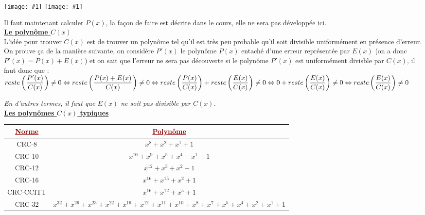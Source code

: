 \documentclass{article}
\newcommand{\dred}[1]{\textcolor{darkred}{\textbf{#1}}}
\newcommand{\imageR}[2]{\texttt{[image: \#1]}}
\newcommand{\imageRT}[2]{\texttt{[image: \#1]}}
\newcommand{\stitre}[1]{\noindent\textbf{\underline{#1}} \\}
\begin{document}
\begin{center}\imageRT{CN_107.png}{100} \imageR{CN_108.png}{200}\end{center}

\noindent Il faut maintenant calculer $P(x)$, la façon de faire est décrite dans le cours, elle ne sera pas 
développée ici. \\

\stitre{Le polynôme $C(x)$}

\noindent L'idée pour trouver $C(x)$ est de trouver un polynôme tel qu'il est très peu probable qu'il soit 
divisible uniformément en présence d'erreur. On prouve ça de la manière suivante, on considère $P'(x)$ le 
polynôme $P(x)$ entaché d'une erreur représentée par $E(x)$ (on a donc $P'(x)=P(x)+E(x)$) et on sait que l'erreur
ne sera pas découverte si le polynôme $P'(x)$ est uniformément divisble par $C(x)$, il faut donc que : \\
$reste\left(\dfrac{P'(x)}{C(x)}\right) \neq 0 \\
\Leftrightarrow reste\left(\dfrac{P(x)+E(x)}{C(x)}\right) \neq 0 \\
\Leftrightarrow reste\left(\dfrac{P(x)}{C(x)}\right) + reste\left(\dfrac{E(x)}{C(x)}\right) \neq 0 \\
\Leftrightarrow 0 + reste\left(\dfrac{E(x)}{C(x)}\right) \neq 0 \\
\Leftrightarrow reste\left(\dfrac{E(x)}{C(x)}\right) \neq 0 \\$

\noindent\textit{En d'autres termes, il faut que $E(x)$ ne soit pas divisible par $C(x)$.} \\

\stitre{Les polynômes $C(x)$ typiques}

\begin{center}
	\begin{tabular}{|*{2}{c|}}
	\hline
	\dred{\underline{Norme}} & \dred{\underline{Polynôme}} \\
	\hline
	CRC-8 & $x^8+x^2+x^1+1$ \\
	\hline
	CRC-10 & $x^{10}+x^9+x^5+x^4+x^1+1$ \\
	\hline
	CRC-12 & $x^{12}+x^3+x^2+1$ \\
	\hline
	CRC-16 & $x^{16}+x^{15}+x^2+1$ \\
	\hline
	CRC-CCITT & $x^{16}+x^{12}+x^5+1$ \\
	\hline
	CRC-32 & $x^{32}+x^{26}+x^{23}+x^{22}+x^{16}+x^{12}+x^{11}+x^{10}+x^8+x^7+x^5+x^4+x^2+x^1+1$ \\
	\hline
	\end{tabular}
\end{center}
\end{document}
